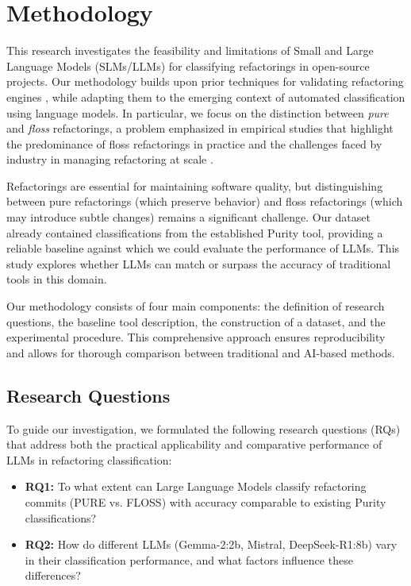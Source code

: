 \section{Methodology}

This research investigates the feasibility and limitations of Small and Large Language Models (SLMs/LLMs) for classifying refactorings in open-source projects. Our methodology builds upon prior techniques for validating refactoring engines \cite{soares2011identifying, mongiovi2015scaling}, while adapting them to the emerging context of automated classification using language models. In particular, we focus on the distinction between \textit{pure} and \textit{floss} refactorings, a problem emphasized in empirical studies that highlight the predominance of floss refactorings in practice \cite{agnihotri2022refactoring,soetens2013floss} and the challenges faced by industry in managing refactoring at scale \cite{ivers2022industry,kim2014microsoft}.

Refactorings are essential for maintaining software quality, but distinguishing between pure refactorings (which preserve behavior) and floss refactorings (which may introduce subtle changes) remains a significant challenge. Our dataset already contained classifications from the established Purity tool, providing a reliable baseline against which we could evaluate the performance of LLMs. This study explores whether LLMs can match or surpass the accuracy of traditional tools in this domain.

Our methodology consists of four main components: the definition of research questions, the baseline tool description, the construction of a dataset, and the experimental procedure. This comprehensive approach ensures reproducibility and allows for thorough comparison between traditional and AI-based methods.

\subsection{Research Questions}

To guide our investigation, we formulated the following research questions (RQs) that address both the practical applicability and comparative performance of LLMs in refactoring classification:

\begin{itemize}
    \item \textbf{RQ1:} To what extent can Large Language Models classify refactoring commits (PURE vs. FLOSS) with accuracy comparable to existing Purity classifications?
    \item \textbf{RQ2:} How do different LLMs (Gemma-2:2b, Mistral, DeepSeek-R1:8b) vary in their classification performance, and what factors influence these differences?
\end{itemize}

